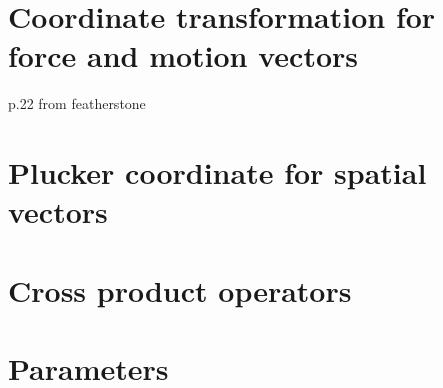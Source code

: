 \documentclass[report.tex]{subfiles}
\begin{document}
    \chapter{Coordinate transformation for force and motion vectors}
    p.22 from featherstone
    \chapter{Plucker coordinate for spatial vectors}
    
    \chapter{Cross product operators}

    \chapter{Parameters}
\end{document}
